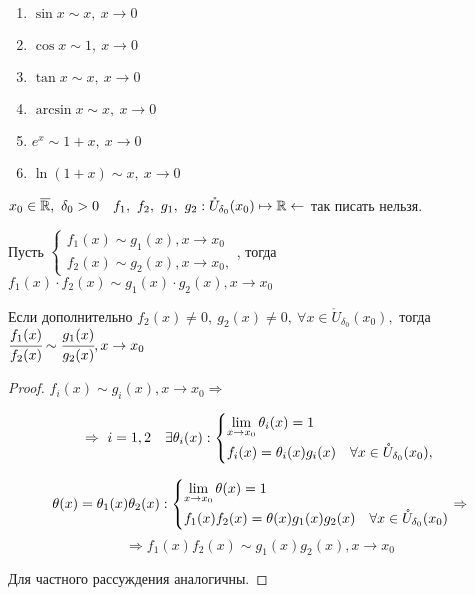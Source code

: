 \begin{examples} $\ $
        \begin{enumerate}
        \item $\sin x \sim x, \ x\to 0$
        \item $\cos x \sim 1,\ x\to 0$
        \item $\tan x \sim x,\ x \to 0$
        \item $\arcsin x \sim x,\ x \to 0$
        \item $e^{x} \sim 1+x,\ x\to 0$
        \item $\ln(1+x) \sim x,\ x\to 0$
    \end{enumerate}
\end{examples}
    


\begin{properties}
    $x_{0} \in \overline{\mathbb{R}}, \ \delta_{0} > 0 \quad f_{1},\ f_{2},\ g_{1},\ g_{2}: \mathring{U}_{\delta_{0}}(x_{0}) \mapsto \mathbb{R} \leftarrow$ так писать нельзя.

    Пусть $\left\{
    \begin{gathered}
        f_{1}(x) \sim g_{1}(x), x\to x_{0} \\
        f_{2}(x) \sim g_{2}(x), x\to x_{0},
    \end{gathered} \right.$, тогда $f_{1}(x) \cdot f_{2} (x) \sim g_{1}(x) \cdot g_{2} (x), x\to x_{0}$

    Если дополнительно $f_{2}(x) \neq 0,\  g_{2}(x) \neq 0, \ \forall x\in \mathring{U}_{\delta_{0}}(x_{0}),$ тогда $\cfrac{f_{1}(x)}{f_{2}(x)} \sim \cfrac{g_{1}(x)}{g_{2}(x)}, x\to x_{0}$
\end{properties}
\begin{proof}
    $f_{i}(x) \sim g_{i}(x), x\to x_{0} \Rightarrow $
    
    $$
    \Rightarrow \ i =1,2\quad  \exists \theta_{i}(x): \left\{
    \begin{gathered}
        \lim\limits_{x\to x_{0}} \theta_{i}(x) = 1 \hfill \\
        f_{i}(x) = \theta_{i}(x) g_{i}(x) \quad \forall x\in \mathring{U}_{\delta_{0}}(x_{0}), 
    \end{gathered} \right.$$

    $$
    \theta(x) = \theta_{1}(x)\theta_{2}(x): 
    \left\{ \begin{gathered}
        \lim\limits_{x \to x_{0}} \theta(x)= 1 \hfill \\
        f_{1}(x)f_{2}(x) = \theta(x) g_{1}(x)g_{2}(x) \quad \forall x\in \mathring{U}_{\delta_{0}}(x_{0})\hfill
        \end{gathered} \right.
        \Rightarrow
    $$
    $$
    \Rightarrow
        f_{1}(x)f_{2}(x)\sim g_{1}(x)g_{2}(x), x\to x_{0}
    $$

    Для частного рассуждения аналогичны.
\end{proof}

